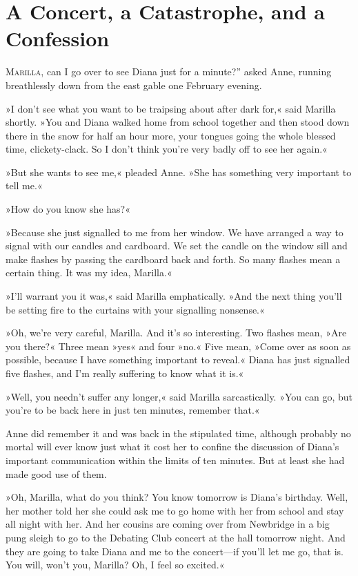 \chapter{A Concert, a Catastrophe, and a Confession}
	
\lettrine[ante=“,lines=4]{M}{arilla}, can I go over to see Diana just for a minute?” asked Anne, running breathlessly down from the east gable one February evening.

\zz
»I don't see what you want to be traipsing about after dark for,« said Marilla shortly. »You and Diana walked home from school together and then stood down there in the snow for half an hour more, your tongues going the whole blessed time, clickety-clack. So I don't think you're very badly off to see her again.«

»But she wants to see me,« pleaded Anne. »She has something very important to tell me.«

»How do you know she has?«

»Because she just signalled to me from her window. We have arranged a way to signal with our candles and cardboard. We set the candle on the window sill and make flashes by passing the cardboard back and forth. So many flashes mean a certain thing. It was my idea, Marilla.«

»I'll warrant you it was,« said Marilla emphatically. »And the next thing you'll be setting fire to the curtains with your signalling nonsense.«

»Oh, we're very careful, Marilla. And it's so interesting. Two flashes mean, »Are you there?« Three mean »yes« and four »no.« Five mean, »Come over as soon as possible, because I have something important to reveal.« Diana has just signalled five flashes, and I'm really suffering to know what it is.«

»Well, you needn't suffer any longer,« said Marilla sarcastically. »You can go, but you're to be back here in just ten minutes, remember that.«

Anne did remember it and was back in the stipulated time, although probably no mortal will ever know just what it cost her to confine the discussion of Diana's important communication within the limits of ten minutes. But at least she had made good use of them.

»Oh, Marilla, what do you think? You know tomorrow is Diana's birthday. Well, her mother told her she could ask me to go home with her from school and stay all night with her. And her cousins are coming over from Newbridge in a big pung sleigh to go to the Debating Club concert at the hall tomorrow night. And they are going to take Diana and me to the concert—if you'll let me go, that is. You will, won't you, Marilla? Oh, I feel so excited.«

